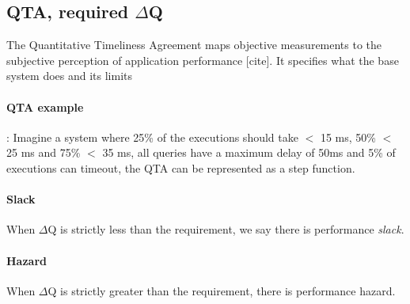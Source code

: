     \subsection{QTA, required $\Delta$Q}
         The Quantitative Timeliness Agreement maps objective measurements to the subjective perception of application performance [cite]. It specifies what the base system does and its limits
         \paragraph{QTA example}: Imagine a system where 25\% of the executions should take $<$ 15 ms, 50\% $<$ 25 ms and 75\% $<$ 35 ms, all queries have a maximum delay of 50ms and 5\% of executions can timeout, the QTA can be represented as a step function.
    
        \paragraph{Slack} When $\Delta$Q is strictly less than the requirement, we say there is performance \textit{slack}.

        \paragraph{Hazard} When $\Delta$Q is strictly greater than the requirement, there is performance hazard.


